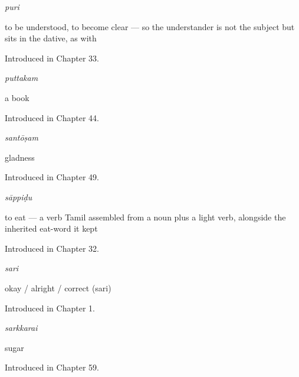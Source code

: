 \noindent\begin{minipage}[t]{\linewidth}
\raggedright
\textbf{}\enspace\emph{puri}\par
\small to be understood, to become clear — so the understander is not the subject but sits in the dative, as with \par
\footnotesize Introduced in Chapter 33.
\end{minipage}\par\medskip

\noindent\begin{minipage}[t]{\linewidth}
\raggedright
\textbf{}\enspace\emph{puttakam}\par
\small a book\par
\footnotesize Introduced in Chapter 44.
\end{minipage}\par\medskip

\noindent\begin{minipage}[t]{\linewidth}
\raggedright
\textbf{}\enspace\emph{santōṣam}\par
\small gladness\par
\footnotesize Introduced in Chapter 49.
\end{minipage}\par\medskip

\noindent\begin{minipage}[t]{\linewidth}
\raggedright
\textbf{}\enspace\emph{sāppiḍu}\par
\small to eat — a verb Tamil assembled from a noun plus a light verb, alongside the inherited eat-word it kept\par
\footnotesize Introduced in Chapter 32.
\end{minipage}\par\medskip

\noindent\begin{minipage}[t]{\linewidth}
\raggedright
\textbf{}\enspace\emph{sari}\par
\small okay / alright / correct (sari)\par
\footnotesize Introduced in Chapter 1.
\end{minipage}\par\medskip

\noindent\begin{minipage}[t]{\linewidth}
\raggedright
\textbf{}\enspace\emph{sarkkarai}\par
\small sugar\par
\footnotesize Introduced in Chapter 59.
\end{minipage}\par\medskip

